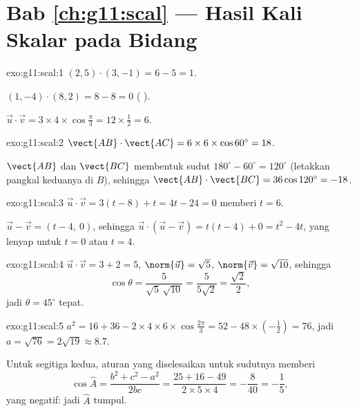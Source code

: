 \section*{Bab \ref{ch:g11:scal} --- Hasil Kali Skalar pada Bidang}

\begin{solution}{exo:g11:scal:1}
$(2,5)\cdot(3,-1) = 6 - 5 = 1$.

$(1,-4)\cdot(8,2) = 8 - 8 = 0$ ( ).

$\vec u\cdot\vec v = 3 \times 4 \times \cos\frac\pi3 = 12 \times \frac12
= 6$.
\end{solution}

\begin{solution}{exo:g11:scal:2}
$\vect{AB}\cdot\vect{AC} = 6 \times 6 \times \cos 60^\circ = 18$.

 $\vect{AB}$ dan $\vect{BC}$ membentuk sudut
$180^\circ - 60^\circ = 120^\circ$ (letakkan pangkal keduanya di $B$), sehingga
$\vect{AB}\cdot\vect{BC} = 36 \cos 120^\circ = -18$.
\end{solution}

\begin{solution}{exo:g11:scal:3}
$\vec u \cdot \vec v = 3(t - 8) + t = 4t - 24 = 0$ memberi $t = 6$.

$\vec u - \vec v = (t - 4,\ 0)$, sehingga
$\vec u \cdot (\vec u - \vec v) = t(t-4) + 0 = t^2 - 4t$, yang lenyap
untuk $t = 0$ atau $t = 4$.
\end{solution}

\begin{solution}{exo:g11:scal:4}
$\vec u \cdot \vec v = 3 + 2 = 5$, $\norm{\vec u} = \sqrt5$,
$\norm{\vec v} = \sqrt{10}$, sehingga
\[
\cos\theta = \frac{5}{\sqrt5\,\sqrt{10}} = \frac{5}{5\sqrt2}
= \frac{\sqrt2}{2},
\]
jadi $\theta = 45^\circ$ tepat.
\end{solution}

\begin{solution}{exo:g11:scal:5}
$a^2 = 16 + 36 - 2 \times 4 \times 6 \times \cos\frac{2\pi}{3}
= 52 - 48 \times \left(-\frac12\right) = 76$, jadi $a = \sqrt{76} =
2\sqrt{19} \approx 8.7$.

Untuk segitiga kedua, aturan  yang diselesaikan untuk sudutnya memberi
\[
\cos\widehat A = \frac{b^2 + c^2 - a^2}{2bc}
= \frac{25 + 16 - 49}{2 \times 5 \times 4} = -\frac{8}{40} = -\frac15,
\]
yang negatif: jadi $\widehat A$ tumpul.
\end{solution}


